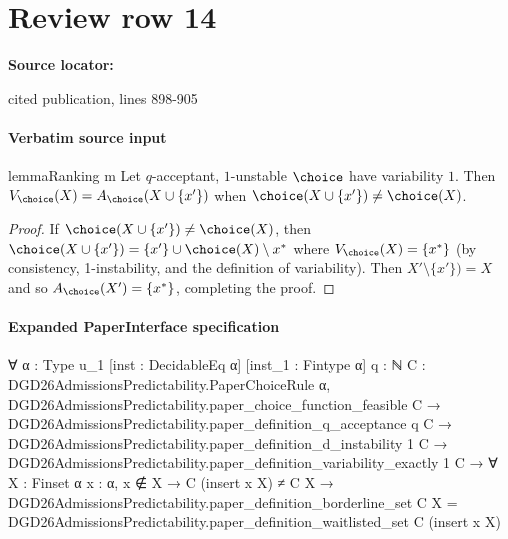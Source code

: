 \documentclass[10pt]{article}
\begin{document}
\section*{Review row 14}
\textbf{Source locator:} {\footnotesize\raggedright cited publication, lines 898-\allowbreak{}905\par}
\paragraph{Verbatim source input}
\begin{ReviewVerbatim}
\begin{restatable}{lemma}{Ranking m}
\label{lem:a-v-equal}
Let $q$-acceptant, $1$-unstable $\choice$ have variability $1$. Then $V_\choice(X) = A_\choice(X \cup \{x'\})$ when $\choice(X \cup \{x'\}) \neq \choice(X)$.
\end{restatable}

\begin{proof}
If $\choice(X \cup \{x'\}) \neq \choice(X)$, then $\choice(X \cup \{x'\}) = \{x'\} \cup \choice(X) \setminus x^*$ where $V_\choice(X) = \{x^*\}$ (by consistency, 1-instability, and the definition of variability). Then $X' \setminus \{x'\}) = X$ and so $A_\choice(X') = \{x^*\}$, completing the proof.
\end{proof}
\end{ReviewVerbatim}



\paragraph{Expanded PaperInterface specification}
\begin{ReviewVerbatim}
∀ {α : Type u_1} [inst : DecidableEq α] [inst_1 : Fintype α] {q : ℕ}
  {C : DGD26AdmissionsPredictability.PaperChoiceRule α},
  DGD26AdmissionsPredictability.paper_choice_function_feasible C →
    DGD26AdmissionsPredictability.paper_definition_q_acceptance q C →
      DGD26AdmissionsPredictability.paper_definition_d_instability 1 C →
        DGD26AdmissionsPredictability.paper_definition_variability_exactly 1 C →
          ∀ {X : Finset α} {x : α},
            x ∉ X →
              C (insert x X) ≠ C X →
                DGD26AdmissionsPredictability.paper_definition_borderline_set C X =
                  DGD26AdmissionsPredictability.paper_definition_waitlisted_set C (insert x X)
\end{ReviewVerbatim}
\end{document}
